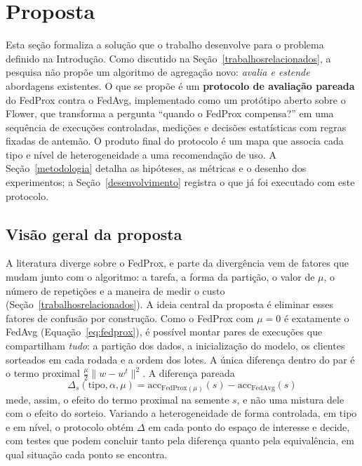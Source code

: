 \section{Proposta}
\label{proposta}

Esta seção formaliza a solução que o trabalho desenvolve para o problema definido na Introdução. Como discutido na Seção~\ref{trabalhosrelacionados}, a pesquisa não propõe um algoritmo de agregação novo: \emph{avalia e estende} abordagens existentes. O que se propõe é um \textbf{protocolo de avaliação pareada} do FedProx contra o FedAvg, implementado como um protótipo aberto sobre o Flower, que transforma a pergunta ``quando o FedProx compensa?'' em uma sequência de execuções controladas, medições e decisões estatísticas com regras fixadas de antemão. O produto final do protocolo é um mapa que associa cada tipo e nível de heterogeneidade a uma recomendação de uso. A Seção~\ref{metodologia} detalha as hipóteses, as métricas e o desenho dos experimentos; a Seção~\ref{desenvolvimento} registra o que já foi executado com este protocolo.

\subsection{Visão geral da proposta}
\label{sec:visao}

A literatura diverge sobre o FedProx, e parte da divergência vem de fatores que mudam junto com o algoritmo: a tarefa, a forma da partição, o valor de $\mu$, o número de repetições e a maneira de medir o custo (Seção~\ref{trabalhosrelacionados}). A ideia central da proposta é eliminar esses fatores de confusão por construção. Como o FedProx com $\mu = 0$ é exatamente o FedAvg (Equação~\eqref{eq:fedprox}), é possível montar pares de execuções que compartilham \emph{tudo}: a partição dos dados, a inicialização do modelo, os clientes sorteados em cada rodada e a ordem dos lotes. A única diferença dentro do par é o termo proximal $\frac{\mu}{2}\lVert w - w^t\rVert^2$. A diferença pareada
\begin{equation}
    \Delta_s(\text{tipo}, \alpha, \mu) = \text{acc}_{\text{FedProx}(\mu)}(s) - \text{acc}_{\text{FedAvg}}(s)
    \label{eq:delta}
\end{equation}
mede, assim, o efeito do termo proximal na semente $s$, e não uma mistura dele com o efeito do sorteio. Variando a heterogeneidade de forma controlada, em tipo e em nível, o protocolo obtém $\Delta$ em cada ponto do espaço de interesse e decide, com testes que podem concluir tanto pela diferença quanto pela equivalência, em qual situação cada ponto se encontra.

